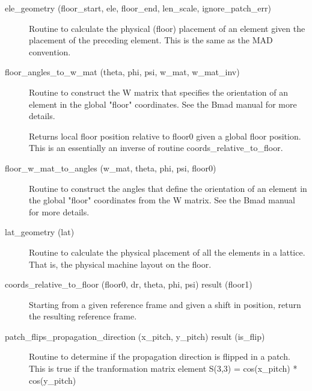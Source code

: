 \begin{description}

\label{r:ele.geometry}
\item[ele_geometry (floor_start, ele, floor_end, len_scale, ignore_patch_err)] \Newline 
Routine to calculate the physical (floor) placement of an element given the
placement of the preceding element. This is the same as the MAD convention.

\label{r:floor.angles.to.w.mat}
\item[floor_angles_to_w_mat (theta, phi, psi, w_mat, w_mat_inv)] \Newline 
Routine to construct the W matrix that specifies the orientation of an element
in the global "floor" coordinates. See the Bmad manual for more details.

\label{r:floor.to.local}
\item[\protect\parbox{6in}{
    coords_floor_to_relative (floor0, global_position, \\
    \hspace*{1in} calculate_angles, is_delta_position) result (local_position)} ] \Newline 
Returns local floor position relative to floor0 given a global floor position.
This is an essentially an inverse of routine coords_relative_to_floor.

\label{r:floor.w.mat.to.angles}
\item[floor_w_mat_to_angles (w_mat, theta, phi, psi, floor0)] \Newline 
Routine to construct the angles that define the orientation of an element
in the global "floor" coordinates from the W matrix. See the Bmad manual for more details.

\label{r:lat.geometry}
\item[lat_geometry (lat)] \Newline
Routine to calculate the physical placement of all the elements in a lattice. 
That is, the physical machine layout on the floor. 

\label{r:local.to.floor}
\item[coords_relative_to_floor (floor0, dr, theta, phi, psi) result (floor1)] \Newline 
Starting from a given reference frame and given a shift in position, return
the resulting reference frame.

\label{r:patch.flips.propagation.direction}
\item[patch_flips_propagation_direction (x_pitch, y_pitch) result (is_flip)] \Newline 
Routine to determine if the propagation direction is flipped in a patch.
This is true if the tranformation matrix element S(3,3) = cos(x_pitch) * cos(y_pitch) 


\end{description}
